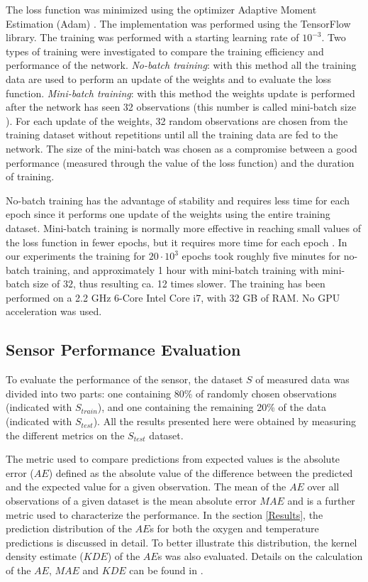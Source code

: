 \documentclass[sensors,article,submit,moreauthors,pdftex,10pt,a4paper]{Definitions/mdpi}
\begin{document}
The loss function was minimized using the optimizer Adaptive Moment Estimation (Adam) \cite{Kingma2014, Michelucci2017}. The implementation was performed using the TensorFlow\texttrademark $\ $library. The training was performed with a starting learning rate of $10^{-3}$. Two types of training were investigated to compare the training efficiency and performance of the network. {\sl No-batch training}: with this method all the training data  are used to perform an update of the weights and to evaluate the loss function. {\sl Mini-batch training}: with this method the weights update is performed after the network has seen 32 observations (this number is called mini-batch size \cite{Michelucci2017}). For each update of the weights, 32 random observations are chosen from the training dataset without repetitions until all the training data are fed to the network. 
The size of the mini-batch was chosen as a compromise between a good performance (measured through the value of the loss function) and the duration of training.

No-batch training has the advantage of stability and requires less time for each epoch since it performs one update of the weights using the entire training dataset. Mini-batch training is normally more effective in reaching small values of the loss function in fewer epochs, but it requires more time for each epoch \cite{Michelucci2017}. In our experiments the training for $20 \cdot 10^3$ epochs took roughly five minutes for no-batch training, and approximately 1 hour with mini-batch training with mini-batch size of $32$, thus resulting ca. 12 times slower. The training has been performed on a 2.2 GHz 6-Core Intel Core i7, with 32 GB of RAM. No GPU acceleration was used. 


\subsection{Sensor Performance Evaluation}

To evaluate the performance of the sensor, the dataset $S$ of measured data was divided into two parts: one containing 80\% of randomly chosen observations (indicated with $S_{train}$), and one containing the remaining 20\% of the data (indicated with $S_{test}$). All the results presented here were obtained by measuring the different metrics on the $S_{test}$ dataset.

The metric used to compare predictions from expected values is the absolute error ($AE$) defined as the absolute value of the difference between the predicted and the expected value for a given observation. 
The mean of the $AE$ over all observations of a given dataset is the mean absolute error $MAE$ and is a further metric used to characterize the performance.
In the section \ref{Results}, the prediction distribution of the $AE$s for both the oxygen and temperature predictions is  discussed in detail. To better illustrate this distribution, the kernel density estimate ($KDE$) of the $AE$s was also evaluated. Details on the calculation of the $AE$, $MAE$ and $KDE$ can be found in \cite{Michelucci2019_2}.
\end{document}
